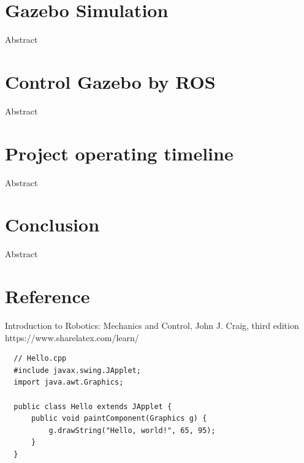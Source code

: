 \documentclass[pdftex,12pt,a4paper]{article}
\begin{document}
  \newpage
  \section{Gazebo Simulation}
  Abstract
  
  \newpage
  \section{Control Gazebo by ROS}
  Abstract

  \newpage
  \section{Project operating timeline}
  Abstract
  
  \newpage
  \section{Conclusion}
  Abstract
  
  \newpage
  \section{Reference}
  Introduction to Robotics: Mechanics and Control, John J. Craig, third edition
  https://www.sharelatex.com/learn/
  \begin{lstlisting}
  // Hello.cpp
  #include javax.swing.JApplet;
  import java.awt.Graphics;
  
  public class Hello extends JApplet {
	  public void paintComponent(Graphics g) {
          g.drawString("Hello, world!", 65, 95);
      }    
  }
  \end{lstlisting}
  
\end{document}
